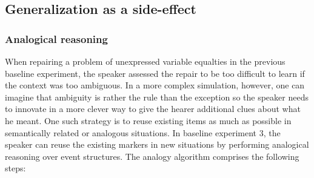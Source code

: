 \subsection{Generalization as a side-effect}
\subsubsection{Analogical reasoning}
When repairing a problem of unexpressed variable equalties in the previous baseline experiment, the speaker assessed the repair to be too difficult to learn if the context was too ambiguous. In a more complex simulation, however, one can imagine that ambiguity is rather the rule than the exception so the speaker needs to innovate in a more clever way to give the hearer additional clues about what he meant. One such strategy is to reuse existing items as much as possible in semantically related or analogous situations. In baseline experiment 3, the speaker can reuse the existing markers in new situations by performing analogical reasoning over event structures. The analogy algorithm comprises the following steps:

